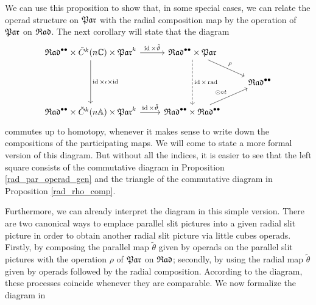 We can use this proposition to show that, in some special cases, we can relate the operad structure on $\mathfrak{Par}$ with the radial composition map by the operation of $\mathfrak{Par}$ on $\mathfrak{Rad}$.
The next corollary will state that the diagram
\[
 \begin{tikzcd}
    \Radt^{\bullet \bullet} \times \tilde C^k(n\C) \times \Part^k \arrow{r}{\id \times \tilde \vartheta} \arrow{dd}{\id \times \iota \times \id} & \Radt^{\bullet \bullet} \times \Part \arrow{dr}{\rho} \arrow[dashed]{dd}{\id \times \radmap} & \\
                                                                                                                              &                                      & \Radt^{\bullet \bullet}\\  
    \Radt^{\bullet \bullet} \times \tilde C^k(n\A) \times \Part^k \arrow{r}{\id \times \tilde \vartheta}                                        & \Radt^{\bullet \bullet} \times \Radt^{\bullet \bullet} \arrow{ur}{\odot \circ t} & 
 \end{tikzcd}
\]
commutes up to homotopy, whenever it makes sense to write down the compositions of the participating maps.
We will come to state a more formal version of this diagram.
But without all the indices, it is easier to see that the left square consists of the commutative diagram in Proposition \ref{rad_par_operad_gen}
and the triangle of the commutative diagram in Proposition \ref{rad_rho_comp}.

Furthermore, we can already interpret the diagram in this simple version.
There are two canonical ways to emplace parallel slit pictures into a given radial slit picture in order to obtain another radial slit picture via little cubes operads.
Firstly, by composing the parallel map $\tilde \theta$ given by operads on the parallel slit pictures with the operation $\rho$ of $\mathfrak{Par}$ on $\mathfrak{Rad}$;
secondly, by using the radial map $\tilde \theta$ given by operads followed by the radial composition.
According to the diagram, these processes coincide whenever they are comparable.
We now formalize the diagram in 

